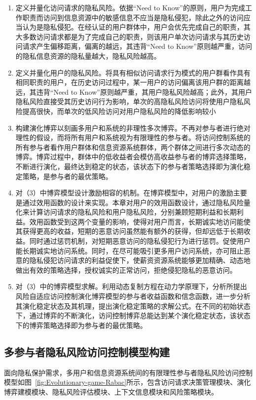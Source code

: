 \begin{enumerate}
	\item 定义并量化访问请求的隐私风险。依据“Need to Know”的原则，用户为完成工作职责而访问到信息资源中的敏感信息不应当是隐私侵犯，除此之外的访问应当认为是隐私侵犯。在经认证的用户群体中，用户会优先完成自己的职责，其大多数访问请求都是为了完成自己的职责，则该用户单次访问请求与其历史访问请求产生偏移距离，偏离的越远，其违背“Need to Know”原则越严重，访问的隐私信息资源的隐私量越大，隐私风险越高。
	\item 定义并量化用户的隐私风险。将具有相似访问请求行为模式的用户群看作具有相同职责的用户，在历史访问过程中，某一用户的访问偏离该用户群的距离越远，其违背“Need to Know”原则越严重，其用户隐私风险越高；此外，其用户隐私风险直接受其历史访问行为影响，单次的高隐私风险访问将使用户隐私风险提高很快，而单次的低风险访问对用户隐私风险的降低影响较小
	\item 构建演化博弈以刻画多用户和系统的非理性多次博弈。不再对参与者进行绝对理性的假设，而将所有用户和系统视为有限理性的参与者。将访问控制系统的所有参与者看作用户群体和信息资源系统群体，两个群体之间进行多次动态的博弈。博弈过程中，群体中的低收益者会模仿高收益参与者的博弈选择策略，不断进行演化，最终达到稳定的状态，该状态下的参与者策略选择即为演化稳定策略，是参与者的最优策略。
	\item 对（3）中博弈模型设计激励相容的机制。在博弈模型中，对用户的激励主要是通过效用函数的设计来实现。本章对用户的效用函数设计，通过隐私风险量化来计算访问请求的隐私风险和用户隐私风险，分别兼顾短期利益和长期利益。效用函数受到这两个变量的影响，使得对用户而言，长期诚实地访问能使其获得更高的收益，短期的恶意访问虽然能有额外的获得，但却远低于长期收益。同时通过惩罚机制，对短期恶意访问的隐私侵犯行为进行惩罚。促使用户能长期诚实地访问系统。同时，在尽可能吸引更多用户访问系统，亦可阻止恶意的隐私侵犯访问请求的利益促使下，使薪资资源系统能够更加精确、动态地做出有效的策略选择，授权诚实的正常访问，拒绝侵犯隐私的恶意访问。
	\item 对（3）中的博弈模型求解。利用动态复制方程在动力学原理下，分析所提出风险自适应访问控制演化博弈模型的参与者收益函数和信念函数，进一步分析其演化稳定状态及其机理，提出演化稳定策略的求解公式。在不同的初始状态下，通过博弈的不断演化，访问控制博弈总能达到某个演化稳定状态，该状态下的博弈策略选择即为参与者的最优策略。
\end{enumerate}

\subsection{多参与者隐私风险访问控制模型构建}
面向隐私保护需求，多用户和信息资源系统间的有限理性参与者隐私风险访问控制模型如图~\ref{fig:Evolutionary-game-Rabac}所示，包含访问请求决策管理模块、演化博弈建模模块、隐私风险评估模块、上下文信息模块和风险策略模块。

